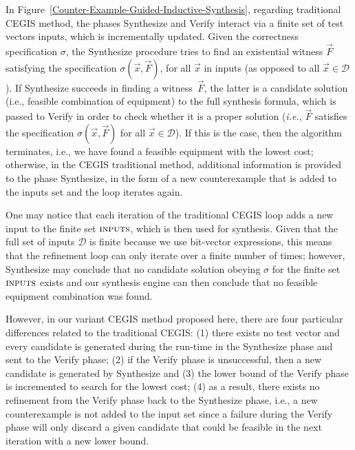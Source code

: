 \documentclass[review]{elsarticle}
\begin{document}
In Figure~\ref{Counter-Example-Guided-Inductive-Synthesis}, regarding traditional CEGIS method, the phases {\sc Synthesize} and {\sc Verify} interact via a finite set of test vectors {\sc inputs}, which is incrementally updated. Given the correctness specification $\sigma$, the {\sc Synthesize} procedure tries to find an existential witness $\vec{F}$ satisfying the specification $\sigma(\vec{x}, \vec{F})$, for all $\vec{x}$ in {\sc inputs} (as opposed to all $\vec{x} \in \mathcal{D}$). If {\sc Synthesize} succeeds in finding a witness~$\vec{F}$, the latter is a candidate solution (i.e., feasible combination of equipment) to the full synthesis formula, which is passed to {\sc Verify} in order to check whether it is a proper solution ({\it i.e.}, $\vec{F}$ satisfies the specification $\sigma(\vec{x}, \vec{F})$ for all $\vec{x}\in\mathcal{D}$). If this is the case, then the algorithm terminates, i.e., we have found a feasible equipment with the lowest cost; otherwise, in the CEGIS traditional method, additional information is provided to the phase {\sc Synthesize}, in the form of a new counterexample that is added to the {\sc inputs} set and the loop iterates again.

One may notice that each iteration of the traditional CEGIS loop adds a new input to the finite set $\text{\sc inputs}$, which is then used for synthesis.  Given that the full set of inputs $\mathcal{D}$ is finite because we use bit-vector expressions, this means that the refinement loop can only iterate over a finite number of times; however, {\sc Synthesize} may conclude that no candidate solution obeying $\sigma$ for the finite set $\text{\sc inputs}$ exists and our synthesis engine can then conclude that no feasible equipment combination was found.

However, in our variant CEGIS method proposed here, there are four particular differences related to the traditional CEGIS: 
(1) there exists no test vector and every candidate is generated during the run-time in the {\sc Synthesize} phase and sent to the {\sc Verify} phase; 
(2) if the {\sc Verify} phase is unsuccessful, then a new candidate is generated by {\sc Synthesize} and 
(3) the lower bound of the {\sc Verify} phase is incremented to search for the lowest cost; 
(4) as a result, there exists no refinement from the {\sc Verify} phase back to the {\sc Synthesize} phase, i.e., 
a new counterexample is not added to the {\sc input} set since a failure during the {\sc Verify} phase will only discard 
a given candidate that could be feasible in the next iteration with a new lower bound.
\end{document}
